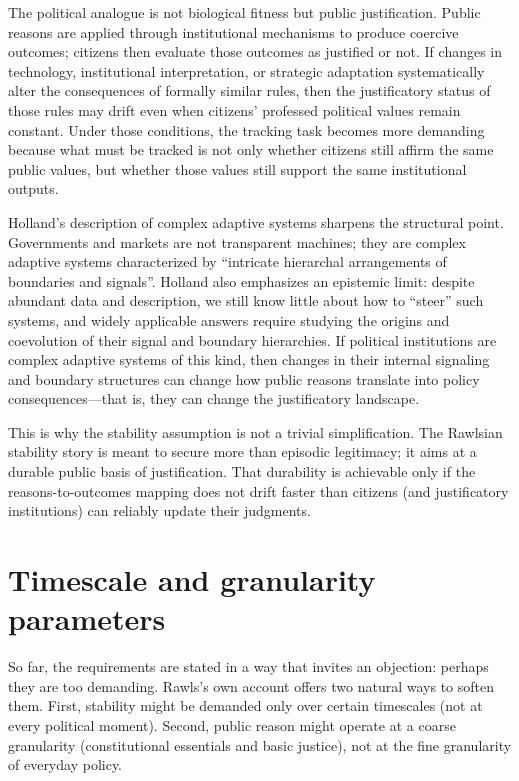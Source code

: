 \documentclass[12pt]{report}
\begin{document}
The political analogue is not biological fitness but public justification. Public reasons are applied through institutional mechanisms to produce coercive outcomes; citizens then evaluate those outcomes as justified or not. If changes in technology, institutional interpretation, or strategic adaptation systematically alter the consequences of formally similar rules, then the justificatory status of those rules may drift even when citizens’ professed political values remain constant. Under those conditions, the tracking task becomes more demanding because what must be tracked is not only whether citizens still affirm the same public values, but whether those values still support the same institutional outputs.

Holland’s description of complex adaptive systems sharpens the structural point. Governments and markets are not transparent machines; they are complex adaptive systems characterized by \enquote{intricate hierarchal arrangements of boundaries and signals}.\parencite[p.~1]{holland2012signals} Holland also emphasizes an epistemic limit: despite abundant data and description, we still know little about how to \enquote{steer} such systems, and widely applicable answers require studying the origins and coevolution of their signal and boundary hierarchies.\parencite[p.~1]{holland2012signals} If political institutions are complex adaptive systems of this kind, then changes in their internal signaling and boundary structures can change how public reasons translate into policy consequences---that is, they can change the justificatory landscape.

This is why the stability assumption is not a trivial simplification. The Rawlsian stability story is meant to secure more than episodic legitimacy; it aims at a durable public basis of justification.\parencite[p.~1]{rawls1987overlapping} That durability is achievable only if the reasons-to-outcomes mapping does not drift faster than citizens (and justificatory institutions) can reliably update their judgments.

\section{Timescale and granularity parameters}\label{sec:params}

So far, the requirements are stated in a way that invites an objection: perhaps they are too demanding. Rawls’s own account offers two natural ways to soften them. First, stability might be demanded only over certain timescales (not at every political moment). Second, public reason might operate at a coarse granularity (constitutional essentials and basic justice), not at the fine granularity of everyday policy.
\end{document}
